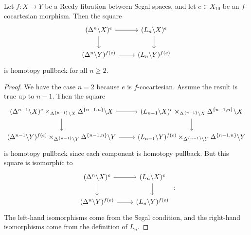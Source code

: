 \documentclass[main.tex]{subfiles}
\begin{document}
\begin{proposition}
  \label{prop:only_lowest_lifting_condition_is_necessary}
  Let $f\colon X \to Y$ be a Reedy fibration between Segal spaces, and let $e \in X_{10}$ be an $f$-cocartesian morphism. Then the square
  \begin{equation*}
    \begin{tikzcd}
      (\Delta^{n} \backslash X)^{e}
      \arrow[r]
      \arrow[d]
      & (L_{n} \backslash X)^{e}
      \arrow[d]
      \\
      (\Delta^{n} \backslash Y)^{f(e)}
      \arrow[r]
      & (L_{n} \backslash Y)^{f(e)}
    \end{tikzcd}
  \end{equation*}
  is homotopy pullback for all $n \geq 2$.
\end{proposition}
\begin{proof}
  We have the case $n = 2$ because $e$ is $f$-cocartesian. Assume the result is true up to $n - 1$. Then the square
  \begin{equation*}
    \begin{tikzcd}
      (\Delta^{n-1} \backslash X)^{e} \times_{\Delta^{\{n-1\}} \backslash X} \Delta^{\{n-1, n\}} \backslash X
      \arrow[r]
      \arrow[d]
      & (L_{n-1} \backslash X)^{e} \times_{\Delta^{\{n-1\}} \backslash X} \Delta^{\{n-1, n\}} \backslash X
      \arrow[d]
      \\
      (\Delta^{n-1} \backslash Y)^{f(e)} \times_{\Delta^{\{n-1\}} \backslash Y} \Delta^{\{n-1, n\}} \backslash Y
      \arrow[r]
      & (L_{n-1} \backslash Y)^{f(e)} \times_{\Delta^{\{n-1\}} \backslash Y} \Delta^{\{n-1, n\}} \backslash Y
    \end{tikzcd}
  \end{equation*}
  is homotopy pullback since each component is homotopy pullback. But this square is isomorphic to
  \begin{equation*}
    \begin{tikzcd}
      (\Delta^{n} \backslash X)^{e}
      \arrow[r]
      \arrow[d]
      & (L_{n} \backslash X)^{e}
      \arrow[d]
      \\
      (\Delta^{n} \backslash Y)^{f(e)}
      \arrow[r]
      & (L_{n} \backslash Y)^{f(e)}
    \end{tikzcd}:
  \end{equation*}
  The left-hand isomorphisms come from the Segal condition, and the right-hand isomorphisms come from the definition of $L_{n}$.
\end{proof}
\end{document}
